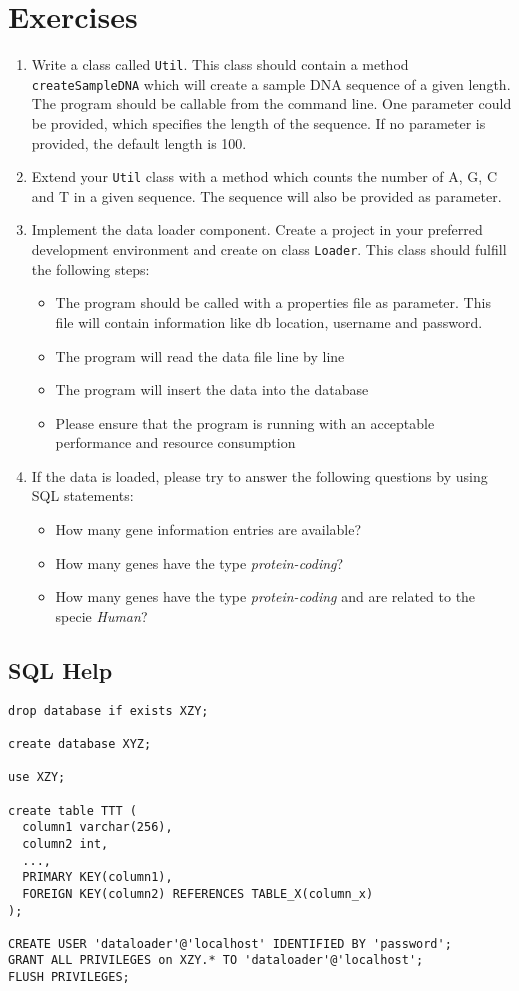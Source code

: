 \section{Exercises}
\begin{enumerate}
\item Write a class called \verb|Util|. This class should contain a method
\verb|createSampleDNA| which will create a sample DNA sequence of
a given length.\\
The program should be callable from the command line. One parameter
could be provided, which specifies the length of the sequence. If
no parameter is provided, the default length is 100.
\item Extend your \verb|Util| class with a method which counts the
number of A, G, C and T in a given sequence. The sequence will also
be provided as parameter.
\item Implement the data loader component. Create a project in your
preferred development environment and create on class \verb|Loader|.
This class should fulfill the following steps:
\begin{itemize}
\item The program should be called with a properties file as parameter.
This file will contain information like db location, username and password.
\item The program will read the data file line by line
\item The program will insert the data into the database
\item Please ensure that the program is running with an acceptable performance and resource consumption
\end{itemize}
\item If the data is loaded, please try to answer the following questions by
using SQL statements:
\begin{itemize}
\item How many gene information entries are available?
\item How many genes have the type \emph{protein-coding}?
\item How many genes have the type \emph{protein-coding} and are
related to the specie \emph{Human}?
\end{itemize}
\end{enumerate}

\subsection{SQL Help}
\begin{lstlisting}
drop database if exists XZY;

create database XYZ;

use XZY;

create table TTT (
  column1 varchar(256),
  column2 int,
  ...,
  PRIMARY KEY(column1),
  FOREIGN KEY(column2) REFERENCES TABLE_X(column_x)
);

CREATE USER 'dataloader'@'localhost' IDENTIFIED BY 'password';
GRANT ALL PRIVILEGES on XZY.* TO 'dataloader'@'localhost';
FLUSH PRIVILEGES;
\end{lstlisting}
